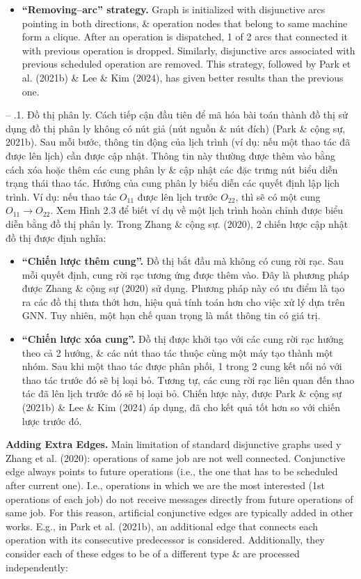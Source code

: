 \documentclass{article}
\begin{document}
\begin{itemize}
\begin{itemize}
\begin{itemize}
\begin{itemize}
                \item {\bf``Removing--arc'' strategy.} Graph is initialized with disjunctive arcs pointing in both directions, \& operation nodes that belong to same machine form a clique. After an operation is dispatched, 1 of 2 arcs that connected it with previous operation is dropped. Similarly, disjunctive arcs associated with previous scheduled operation are removed. This strategy, followed by Park et al. (2021b) \& Lee \& Kim (2024), has given better results than the previous one.
            \end{itemize}
            -- {.1. Đồ thị phân ly.} Cách tiếp cận đầu tiên để mã hóa bài toán thành đồ thị sử dụng đồ thị phân ly không có nút giả (nút nguồn \& nút đích) (Park \& cộng sự, 2021b). Sau mỗi bước, thông tin động của lịch trình (ví dụ: nếu một thao tác đã được lên lịch) cần được cập nhật. Thông tin này thường được thêm vào bằng cách xóa hoặc thêm các cung phân ly \& cập nhật các đặc trưng nút biểu diễn trạng thái thao tác. Hướng của cung phân ly biểu diễn các quyết định lập lịch trình. Ví dụ: nếu thao tác $O_{11}$ được lên lịch trước $O_{22}$, thì sẽ có một cung $O_{11}\to O_{22}$. Xem {\sf Hình 2.3} để biết ví dụ về một lịch trình hoàn chỉnh được biểu diễn bằng đồ thị phân ly. Trong Zhang \& cộng sự. (2020), 2 chiến lược cập nhật đồ thị được định nghĩa:
            \begin{itemize}
                \item {\bf ``Chiến lược thêm cung''.} Đồ thị bắt đầu mà không có cung rời rạc. Sau mỗi quyết định, cung rời rạc tương ứng được thêm vào. Đây là phương pháp được Zhang \& cộng sự (2020) sử dụng. Phương pháp này có ưu điểm là tạo ra các đồ thị thưa thớt hơn, hiệu quả tính toán hơn cho việc xử lý dựa trên GNN. Tuy nhiên, một hạn chế quan trọng là mất thông tin có giá trị.
                \item {\bf ``Chiến lược xóa cung''.} Đồ thị được khởi tạo với các cung rời rạc hướng theo cả 2 hướng, \& các nút thao tác thuộc cùng một máy tạo thành một nhóm. Sau khi một thao tác được phân phối, 1 trong 2 cung kết nối nó với thao tác trước đó sẽ bị loại bỏ. Tương tự, các cung rời rạc liên quan đến thao tác đã lên lịch trước đó sẽ bị loại bỏ. Chiến lược này, được Park \& cộng sự (2021b) \& Lee \& Kim (2024) áp dụng, đã cho kết quả tốt hơn so với chiến lược trước đó.
            \end{itemize}
            {\bf Adding Extra Edges.} Main limitation of standard disjunctive graphs used y Zhang et al. (2020): operations of same job are not well connected. Conjunctive edge always points to future operations (i.e., the one that has to be scheduled after current one). I.e., operations in which we are the most interested (1st operations of each job) do not receive messages directly from future operations of same job. For this reason, artificial conjunctive edges are typically added in other works. E.g., in Park et al. (2021b), an additional edge that connects each operation with its consecutive predecessor is considered. Additionally, they consider each of these edges to be of a different type \& are processed independently:

\end{itemize}
\end{itemize}
\end{itemize}
\end{document}
